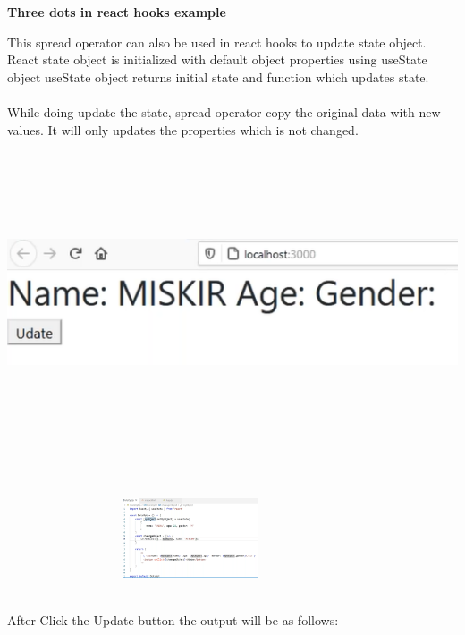 \documentclass{article}
\begin{document}
\noindent \textbf{}

\noindent 
\textbf{Three dots in react hooks example}

\noindent 
This spread operator can also be used in react hooks to update state object. React state object is initialized with default object properties using useState object useState object returns initial state and function which updates state.
\\
\noindent \\
While doing update the state, spread operator copy the original data with new values. It will only updates the properties which is not changed.

\noindent 

\noindent 

\begin{center}
	\noindent \includegraphics*[width=6.18in, height=3.50in]{IMG-10-07}
\end{center}

\noindent \\


\noindent 
\begin{center}
	
\noindent \includegraphics*[width=4.26in, height=0.92in]{IMG-10-08}
\end{center}

\noindent 

\noindent \\
After Click the Update button the output will be as follows:
\end{document}
